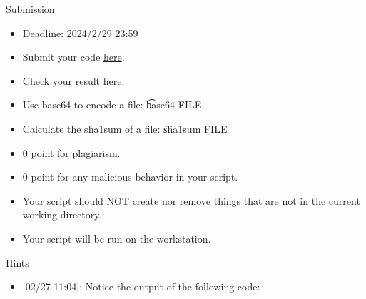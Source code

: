 \begin{frame}{Submission}
\begin{itemize}
\item Deadline: 2024/2/29 23:59
\item Submit your code \href{https://forms.gle/ruzJYMdvkmZ6u9CY9}{here}.
\item Check your result \href{https://docs.google.com/spreadsheets/d/1WM8s-83BM6E4rtIQqPEAteCGHQWJ7LZSKluali3owi0/edit?usp=sharing}{here}.
\item Use base64 to encode a file: \t{base64 FILE}
\item Calculate the sha1sum of a file: \t{sha1sum FILE}
\item $0$ point for plagiarism.
\item $0$ point for any malicious behavior in your script.
\item Your script should NOT create nor remove things that are not in the current working directory.
\item Your script will be run on the workstation.
\end{itemize}
\end{frame}

\begin{frame}{Hints}
\begin{itemize}
\item {[}02/27 11:04{]}: Notice the output of the following code:

\end{itemize}
\end{frame}
